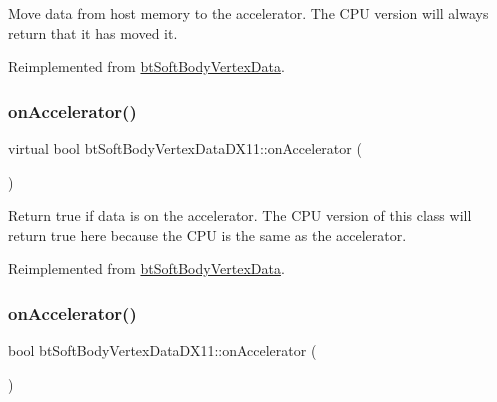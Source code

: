Move data from host memory to the accelerator. The C\+PU version will always return that it has moved it. 

Reimplemented from \hyperlink{classbtSoftBodyVertexData_a2d3f04a5b2461bf95beca6f3fc48e28b}{bt\+Soft\+Body\+Vertex\+Data}.

\mbox{\label{classbtSoftBodyVertexDataDX11_a60f9399bc7a7d652a55e7f1f2140f2b3}} 
\subsubsection{\texorpdfstring{on\+Accelerator()}{onAccelerator()}\hspace{0.1cm}{\footnotesize\ttfamily [1/2]}}
{\footnotesize\ttfamily virtual bool bt\+Soft\+Body\+Vertex\+Data\+D\+X11\+::on\+Accelerator (\begin{DoxyParamCaption}{ }\end{DoxyParamCaption})\hspace{0.3cm}{\ttfamily [virtual]}}

Return true if data is on the accelerator. The C\+PU version of this class will return true here because the C\+PU is the same as the accelerator. 

Reimplemented from \hyperlink{classbtSoftBodyVertexData_a6512d196039f6445489a093ad18f7764}{bt\+Soft\+Body\+Vertex\+Data}.

\mbox{\label{classbtSoftBodyVertexDataDX11_a735a87a0a4acc856b2f656bf684852e4}} 
\subsubsection{\texorpdfstring{on\+Accelerator()}{onAccelerator()}\hspace{0.1cm}{\footnotesize\ttfamily [2/2]}}
{\footnotesize\ttfamily bool bt\+Soft\+Body\+Vertex\+Data\+D\+X11\+::on\+Accelerator (\begin{DoxyParamCaption}{ }\end{DoxyParamCaption})\hspace{0.3cm}{\ttfamily [virtual]}}

